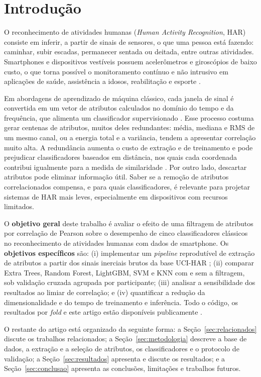 \documentclass[conference]{IEEEtran}
\begin{document}
\section{Introdução}
O reconhecimento de atividades humanas (\textit{Human Activity Recognition}, HAR) consiste em inferir, a partir de sinais de sensores, o que uma pessoa está fazendo: caminhar, subir escadas, permanecer sentada ou deitada, entre outras atividades. Smartphones e dispositivos vestíveis possuem acelerômetros e giroscópios de baixo custo, o que torna possível o monitoramento contínuo e não intrusivo em aplicações de saúde, assistência a idosos, reabilitação e esporte \cite{Lara2013,Bulling2014}.

Em abordagens de aprendizado de máquina clássico, cada janela de sinal é convertida em um vetor de atributos calculados no domínio do tempo e da frequência, que alimenta um classificador supervisionado \cite{Bulling2014}. Esse processo costuma gerar centenas de atributos, muitos deles redundantes: média, mediana e RMS de um mesmo canal, ou a energia total e a variância, tendem a apresentar correlação muito alta. A redundância aumenta o custo de extração e de treinamento e pode prejudicar classificadores baseados em distância, nos quais cada coordenada contribui igualmente para a medida de similaridade \cite{Guyon2003}. Por outro lado, descartar atributos pode eliminar informação útil. Saber se a remoção de atributos correlacionados compensa, e para quais classificadores, é relevante para projetar sistemas de HAR mais leves, especialmente em dispositivos com recursos limitados.

O \textbf{objetivo geral} deste trabalho é avaliar o efeito de uma filtragem de atributos por correlação de Pearson sobre o desempenho de cinco classificadores clássicos no reconhecimento de atividades humanas com dados de smartphone. Os \textbf{objetivos específicos} são: (i) implementar um \textit{pipeline} reprodutível de extração de atributos a partir dos sinais inerciais brutos da base UCI-HAR \cite{UCI-HAR}; (ii) comparar Extra Trees, Random Forest, LightGBM, SVM e KNN com e sem a filtragem, sob validação cruzada agrupada por participante; (iii) analisar a sensibilidade dos resultados ao limiar de correlação; e (iv) quantificar a redução da dimensionalidade e do tempo de treinamento e inferência. Todo o código, os resultados por \textit{fold} e este artigo estão disponíveis publicamente \cite{Repositorio}.

O restante do artigo está organizado da seguinte forma: a Seção~\ref{sec:relacionados} discute os trabalhos relacionados; a Seção~\ref{sec:metodologia} descreve a base de dados, a extração e a seleção de atributos, os classificadores e o protocolo de validação; a Seção~\ref{sec:resultados} apresenta e discute os resultados; e a Seção~\ref{sec:conclusao} apresenta as conclusões, limitações e trabalhos futuros.
\end{document}

